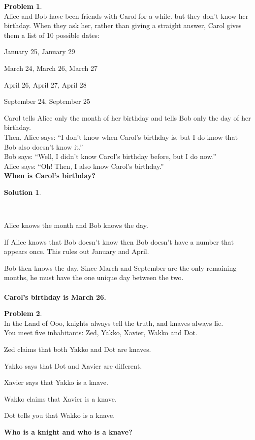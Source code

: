 \documentclass{article}
\theoremstyle{definition}
\newtheorem{problem}{Problem}
\newtheorem*{solution}{Solution}
\begin{document}
\begin{problem}\ \\
Alice and Bob have been friends with Carol for a while. but they don't know her birthday.  When they ask her, rather than giving a straight answer, Carol gives them a list of 10 possible dates:
\begin{compactenum}
\item January 25, January 29
\item March 24, March 26, March 27
\item April 26, April 27, April 28
\item September 24, September 25
\end{compactenum}
Carol tells Alice only the month of her birthday and tells Bob only the day of her birthday.\\
Then, Alice says: ``I don't  know when Carol's birthday is, but I do know that Bob also doesn't know it.''\\
Bob says: ``Well, I didn't know Carol's birthday before, but I do now.''\\
Alice says: ``Oh! Then, I also know Carol's birthday.''\\
\textbf{When is Carol's birthday?}
\end{problem}

\begin{solution}
\begin{compactenum}\ \\
\item Alice knows the month and Bob knows the day.
\item If Alice knows that Bob doesn't know then Bob doesn't have a number that appears once. This rules out January and April.
\item Bob then knows the day. Since March and September are the only remaining months, he must have the one unique day between the two. 
\ \\
\ \\
\textbf{Carol's birthday is March 26.}

\end{compactenum}
\end{solution}
\newpage

\begin{problem}\ \\
In the Land of Ooo, knights always tell the truth, and knaves always lie.\\
You meet five inhabitants: Zed, Yakko, Xavier, Wakko and Dot.  
\begin{compactenum}
\item Zed claims that both Yakko and Dot are knaves.
\item Yakko says that Dot and Xavier are different.
\item Xavier says that Yakko is a knave.
\item Wakko claims that Xavier is a knave.
\item Dot tells you that Wakko is a knave.
\end{compactenum}
\textbf{Who is a knight and who is a knave?}
\end{problem}
\end{document}
